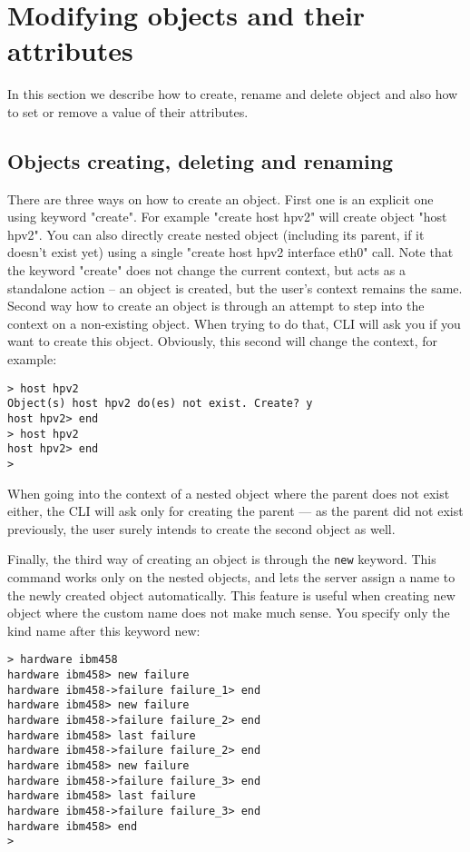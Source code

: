\documentclass[deska]{subfiles}
\begin{document}
\section{Modifying objects and their attributes}

In this section we describe how to create, rename and delete object and also how to set or remove a value of their
attributes.

\subsection{Objects creating, deleting and renaming}

There are three ways on how to create an object. First one is an explicit one using keyword "create". For example "create
host hpv2" will create object "host hpv2". You can also directly create nested object (including its parent, if it
doesn't exist yet) using a single "create host hpv2 interface eth0" call. Note that the keyword "create" does not change
the current context, but acts as a standalone action -- an object is created, but the user's context remains the same.
Second way how to create an object is through an attempt to step into the context on a non-existing object.
When trying to do that, CLI will ask you if you want to create this object. Obviously, this second will change the
context, for example:

\begin{verbatim}
> host hpv2
Object(s) host hpv2 do(es) not exist. Create? y
host hpv2> end
> host hpv2
host hpv2> end
>
\end{verbatim}

When going into the context of a nested object where the parent does not exist either, the CLI will ask only for creating the
parent --- as the parent did not exist previously, the user surely intends to create the second object as well.

Finally, the third way of creating an object is through the {\tt new} keyword. This command works only on the nested
objects, and lets the server assign a name to the newly created object automatically. This feature is useful when creating
new object where the custom name does not make much sense. You specify only the kind name after this keyword new:

\begin{verbatim}
> hardware ibm458
hardware ibm458> new failure
hardware ibm458->failure failure_1> end
hardware ibm458> new failure
hardware ibm458->failure failure_2> end
hardware ibm458> last failure
hardware ibm458->failure failure_2> end
hardware ibm458> new failure
hardware ibm458->failure failure_3> end
hardware ibm458> last failure
hardware ibm458->failure failure_3> end
hardware ibm458> end
>
\end{verbatim}
\end{document}
